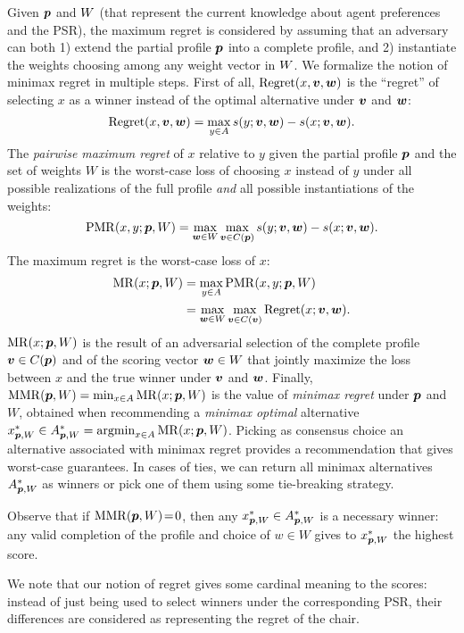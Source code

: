 \documentclass{article}
\begin{document}
Given ${\bm{p}}$ and $W$ (that represent the current knowledge about agent preferences and the PSR),
the maximum regret is considered by assuming that an adversary can both 1) extend the partial profile ${\bm{p}}$ into a complete profile, and 2) instantiate the weights choosing among any weight vector in $W$. %
We formalize the notion of minimax regret in multiple steps.
First of all, $\operatorname{Regret}(x, \bm{v}, \bm{w})$
is the “regret” of selecting $x$ as a winner instead of the optimal alternative under $\bm{v}$ and $\bm{w}$:
$$\operatorname{Regret}(x, \bm{v}, \bm{w}) = \max_{y \in A} s(y; \bm{v},\bm{w}) - s(x; \bm{v}, \bm{w}).$$
 The {\em pairwise maximum regret} of $x$ relative to $y$ given the partial profile ${\bm{p}}$ and the set of weights $W$ is the worst-case loss of choosing $x$ instead of $y$ under all possible realizations of the full profile {\em and} all possible instantiations of the weights:
$$\operatorname{PMR}(x,y;{\bm{p}},W) = \max_{\bm{w} \in W} \max_{\bm{v} \in C({\bm{p}})} s(y; \bm{v},\bm{w}) - s(x; \bm{v},\bm{w}).$$
The maximum regret %
is the worst-case loss of $x$:
\begin{align}
\operatorname{MR}(x;{\bm{p}},W) & = \max_{y \in A} \operatorname{PMR}(x,y; {\bm{p}}, W) \\ &= \max_{\bm{w} \in W} \max_{\bm{v} \in C(\bm{v})} \operatorname{Regret}(x; \bm{v}, \bm{w}).
\end{align}
$\operatorname{MR}(x;{\bm{p}},W)$ is the result of an adversarial selection of the complete profile $\bm{v} \in C({\bm{p}})$ and of the scoring vector $\bm{w} \in W$ that jointly maximize the loss between $x$ and the true winner under $\bm{v}$ and $\bm{w}$.
Finally,  $\operatorname{MMR}({\bm{p}},W) = \min_{x \in A} \operatorname{MR}(x;{\bm{p}},W)$ is the value of {\em minimax regret} under ${\bm{p}}$ and $W$, obtained when recommending a {\em minimax optimal} alternative $x^*_{{\bm{p}}, W} \in A^*_{{\bm{p}}, W} = \operatorname*{argmin}_{x \in A} \operatorname{MR}(x;{\bm{p}},W)$.
Picking as consensus choice an alternative associated with minimax regret provides a recommendation that gives worst-case guarantees. 
In cases of ties, %
we can return all minimax alternatives $A^*_{{\bm{p}}, W}$ as winners or pick one of them using some tie-breaking strategy.

Observe that if $\operatorname{MMR}({\bm{p}}, W)\!=\!0$, then any $x^{*}_{{\bm{p}},W} \in A^*_{{\bm{p}}, W}$ is a necessary winner: any valid completion of the profile and choice of $w \in W$ gives to $x^{*}_{{\bm{p}},W}$ the highest score.

We note that our notion of regret gives some cardinal meaning to the scores: instead of just being used to select winners under the corresponding PSR, their differences are considered as representing the regret of the chair.
\end{document}
